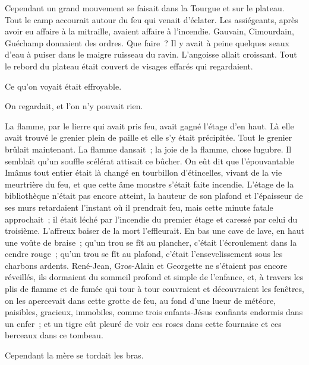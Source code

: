 \documentclass[french,twoside]{book} %
\begin{document}
Cependant un grand mouvement se faisait dans la Tourgue et sur le plateau. Tout le camp accourait autour du feu qui venait d’éclater. Les assiégeants,  après avoir eu affaire à la mitraille, avaient affaire à l’incendie. Gauvain, Cimourdain, Guéchamp donnaient des ordres. Que faire ? Il y avait à peine quelques seaux d’eau à puiser dans le maigre ruisseau du ravin. L’angoisse allait croissant. Tout le rebord du plateau était couvert de visages effarés qui regardaient.\par
Ce qu’on voyait était effroyable.\par
On regardait, et l’on n’y pouvait rien.\par
La flamme, par le lierre qui avait pris feu, avait gagné l’étage d’en haut. Là elle avait trouvé le grenier plein de paille et elle s’y était précipitée. Tout le grenier brûlait maintenant. La flamme dansait ; la joie de la flamme, chose lugubre. Il semblait qu’un souffle scélérat attisait ce bûcher. On eût dit que l’épouvantable Imânus tout entier était là changé en tourbillon d’étincelles, vivant de la vie meurtrière du feu, et que cette âme monstre s’était faite incendie. L’étage de la bibliothèque n’était pas encore atteint, la hauteur de son plafond et l’épaisseur de ses murs retardaient l’instant où il prendrait feu, mais cette minute fatale approchait ; il était léché par l’incendie du premier étage et caressé par celui du troisième. L’affreux baiser de la mort l’effleurait. En bas une cave de lave, en haut une voûte de braise ; qu’un trou se fît au plancher, c’était l’écroulement dans la cendre rouge ; qu’un trou se fît au plafond, c’était l’ensevelissement sous les charbons ardents. René-Jean, Gros-Alain et Georgette ne s’étaient pas encore réveillés, ils dormaient du sommeil profond et simple de l’enfance, et, à travers les plis de flamme et de fumée qui tour  à tour couvraient et découvraient les fenêtres, on les apercevait dans cette grotte de feu, au fond d’une lueur de météore, paisibles, gracieux, immobiles, comme trois enfants-Jésus confiants endormis dans un enfer ; et un tigre eût pleuré de voir ces roses dans cette fournaise et ces berceaux dans ce tombeau.\par
Cependant la mère se tordait les bras.\par
\end{document}
